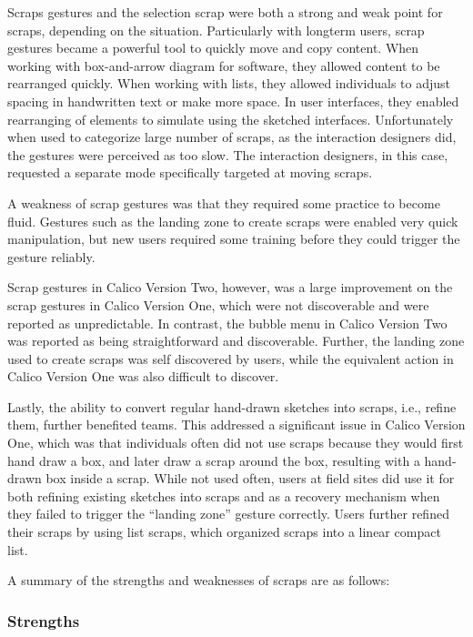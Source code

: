 \documentclass[12pt,fleqn]{ucithesis}
\begin{document}
Scraps gestures and the selection scrap were both a strong and weak point for scraps, depending on the situation. Particularly with longterm users, scrap gestures became a powerful tool to quickly move and copy content. When working with box-and-arrow diagram for software, they allowed content to be rearranged quickly. When working with lists, they allowed individuals to adjust spacing in handwritten text or make more space. In user interfaces, they enabled rearranging of elements to simulate using the sketched interfaces. Unfortunately when used to categorize large number of scraps, as the interaction designers did, the gestures were perceived as too slow. The interaction designers, in this case, requested a separate mode specifically targeted at moving scraps.

A weakness of scrap gestures was that they required some practice to become fluid. Gestures such as the landing zone to create scraps were enabled very quick manipulation, but new users required some training before they could trigger the gesture reliably. 

Scrap gestures in Calico Version Two, however, was a large improvement on the scrap gestures in Calico Version One, which were not discoverable and were reported as unpredictable. In contrast, the bubble menu in Calico Version Two was reported as being straightforward and discoverable. Further, the landing zone used to create scraps was self discovered by users, while the equivalent action in Calico Version One was also difficult to discover. 

Lastly, the ability to convert regular hand-drawn sketches into scraps, i.e., refine them, further benefited teams. This addressed a significant issue in Calico Version One, which was that individuals often did not use scraps because they would first hand draw a box, and later draw a scrap around the box, resulting with a hand-drawn box inside a scrap. While not used often, users at field sites did use it for both refining existing sketches into scraps and as a recovery mechanism when they failed to trigger the ``landing zone'' gesture correctly.  Users further refined their scraps by using list scraps, which organized scraps into a linear compact list. 

A summary of the strengths and weaknesses of scraps are as follows:

\subsubsection{Strengths}
\end{document}

